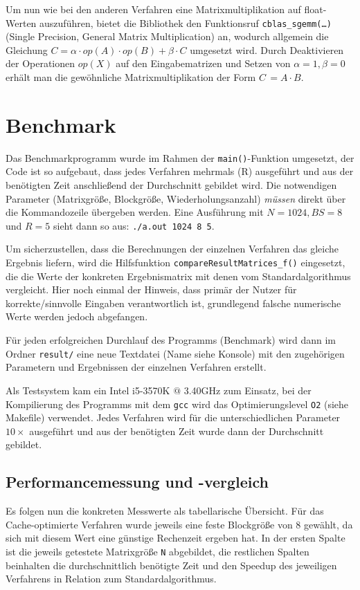 \documentclass[a4paper,11pt]{scrartcl}
\begin{document}
Um nun wie bei den anderen Verfahren eine Matrixmultiplikation auf float-Werten auszuführen, 
bietet die Bibliothek den Funktionsruf \texttt{cblas\_sgemm(…)} (Single Precision, General Matrix Multiplication) an, wodurch allgemein die Gleichung  $C = \alpha \cdot op(A) \cdot op(B) + 
\beta \cdot C$ \cite{blasqr} umgesetzt wird. Durch Deaktivieren der Operationen $op(X)$ auf den 
Eingabematrizen und Setzen von $\alpha = 1, \beta = 0$ erhält man die gewöhnliche Matrixmultiplikation 
der Form $C\,= A \cdot B$.

\section{Benchmark}

Das Benchmarkprogramm wurde im Rahmen der \texttt{main()}-Funktion umgesetzt,
der Code ist so aufgebaut, dass jedes Verfahren mehrmals (R) ausgeführt 
und aus der benötigten Zeit anschließend der Durchschnitt gebildet wird. Die notwendigen Parameter
(Matrixgröße, Blockgröße, Wiederholungsanzahl) \emph{müssen} direkt über die Kommandozeile 
übergeben werden.
Eine Ausführung mit $N = 1024, BS = 8$ und $R = 5$ sieht dann so aus: \texttt{./a.out 1024 8 5}.
\newline

Um sicherzustellen, dass die Berechnungen der einzelnen Verfahren das gleiche Ergebnis
liefern, wird die Hilfsfunktion \texttt{compareResultMatrices\_f()} eingesetzt, die
die Werte der konkreten Ergebnismatrix mit denen vom Standardalgorithmus vergleicht.
Hier noch einmal der Hinweis, dass primär der Nutzer für korrekte/sinnvolle Eingaben verantwortlich ist, 
grundlegend falsche numerische Werte werden jedoch abgefangen.\newline

Für jeden erfolgreichen Durchlauf des Programms (Benchmark) wird dann im Ordner \texttt{result/} eine 
neue Textdatei (Name siehe Konsole) mit den zugehörigen Parametern und Ergebnissen der
einzelnen Verfahren erstellt. \newline

Als Testsystem kam ein Intel i5-3570K $@$ 3.40GHz zum Einsatz, bei der
Kompilierung des Programms mit dem \texttt{gcc} wird das Optimierungslevel \texttt{O2} (siehe Makefile)
verwendet. Jedes Verfahren wird für die unterschiedlichen
Parameter $10 \times$ ausgeführt und aus der benötigten Zeit wurde dann der
Durchschnitt gebildet.


\subsection{Performancemessung und -vergleich}\label{chp:Bench1}
Es folgen nun die konkreten Messwerte als tabellarische Übersicht.
Für das Cache-optimierte Verfahren wurde jeweils eine feste Blockgröße von $8$ gewählt,
da sich mit diesem Wert eine günstige Rechenzeit ergeben hat.
In der ersten Spalte ist die jeweils getestete Matrixgröße \texttt{N} abgebildet, 
die restlichen Spalten beinhalten die durchschnittlich benötigte Zeit und den Speedup des jeweiligen
Verfahrens in Relation zum Standardalgorithmus.
\end{document}
